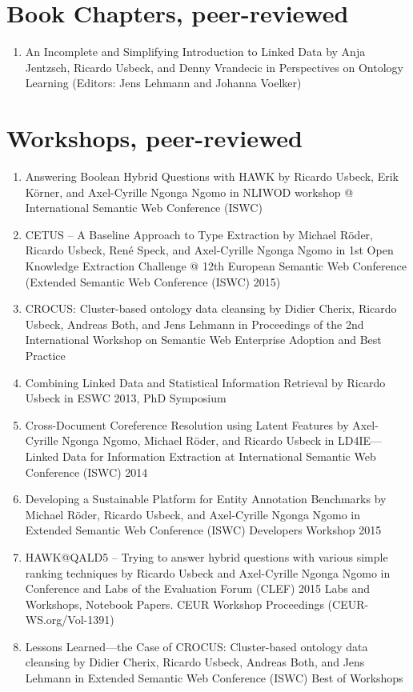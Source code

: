 \section*{Book Chapters, peer-reviewed}
\begin{enumerate}[resume]
\item An Incomplete and Simplifying Introduction to Linked Data by Anja Jentzsch, Ricardo Usbeck, and Denny Vrandecic in Perspectives on Ontology Learning (Editors: Jens Lehmann and Johanna Voelker) 
\end{enumerate}


\section*{Workshops, peer-reviewed}
\begin{enumerate}[resume]
    \item Answering Boolean Hybrid Questions with HAWK by Ricardo Usbeck, Erik Körner, and Axel-Cyrille Ngonga Ngomo in NLIWOD workshop @ International Semantic Web Conference (ISWC)
    \item CETUS -- A Baseline Approach to Type Extraction by Michael Röder, Ricardo Usbeck, René Speck, and Axel-Cyrille Ngonga Ngomo in 1st Open Knowledge Extraction Challenge @ 12th European Semantic Web Conference (Extended Semantic Web Conference (ISWC) 2015) 
    \item CROCUS: Cluster-based ontology data cleansing by Didier Cherix, Ricardo Usbeck, Andreas Both, and Jens Lehmann in Proceedings of the 2nd International Workshop on Semantic Web Enterprise Adoption and Best Practice 
    \item Combining Linked Data and Statistical Information Retrieval by Ricardo Usbeck in ESWC 2013, PhD Symposium  
    \item Cross-Document Coreference Resolution using Latent Features by Axel-Cyrille Ngonga Ngomo, Michael Röder, and Ricardo Usbeck in LD4IE---Linked Data for Information Extraction at International Semantic Web Conference (ISWC) 2014 
    \item Developing a Sustainable Platform for Entity Annotation Benchmarks by Michael Röder, Ricardo Usbeck, and Axel-Cyrille Ngonga Ngomo in Extended Semantic Web Conference (ISWC) Developers Workshop 2015 
    \item HAWK@QALD5 -- Trying to answer hybrid questions with various simple ranking techniques by Ricardo Usbeck and Axel-Cyrille Ngonga Ngomo in Conference and Labs of the Evaluation Forum (CLEF) 2015 Labs and Workshops, Notebook Papers. CEUR Workshop Proceedings (CEUR-WS.org/Vol-1391) 
    \item Lessons Learned---the Case of CROCUS: Cluster-based ontology data cleansing by Didier Cherix, Ricardo Usbeck, Andreas Both, and Jens Lehmann in Extended Semantic Web Conference (ISWC) Best of Workshops 
\end{enumerate}


